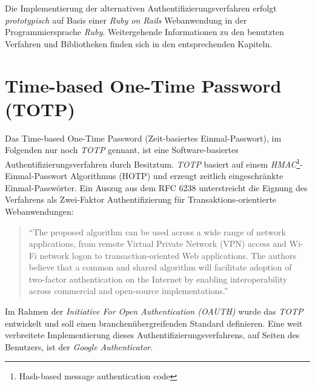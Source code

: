 \documentclass[11pt,a4paper,ngerman]{scrreprt}
\begin{document}
Die Implementierung der alternativen Authentifizierungsverfahren erfolgt \emph{prototypisch} auf Basis einer \textit{Ruby on Rails} Webanwendung in der Programmiersprache \textit{Ruby}. Weitergehende Informationen zu den benutzten Verfahren und Bibliotheken finden sich in den entsprechenden Kapiteln.

\section{Time-based One-Time Password (TOTP)}\label{sec:TOTP}
Das Time-based One-Time Password (Zeit-basiertes Einmal-Passwort), im Folgenden nur noch \textit{TOTP} gennant, ist eine Software-basiertes Authentifizierungsverfahren durch Besitztum. \textit{TOTP} basiert auf einem \textit{HMAC}\footnote{Hash-based message authentication code}-Einmal-Passwort Algorithmus (HOTP) und erzeugt zeitlich eingeschränkte Einmal-Passwörter. Ein Auszug aus dem RFC 6238 unterstreicht die Eignung des Verfahrens als Zwei-Faktor Authentifizierung für Transaktions-orientierte Webanwendungen:
\begin{quote}
    ``The proposed algorithm can be used across a wide range of network
    applications, from remote Virtual Private Network (VPN) access and
    Wi-Fi network logon to transaction-oriented Web applications.  The
    authors believe that a common and shared algorithm will facilitate
    adoption of two-factor authentication on the Internet by enabling
    interoperability across commercial and open-source implementations.'' \cite{rfc6238}
\end{quote}
Im Rahmen der \textit{Initiative For Open Authentication (OAUTH)} wurde das \textit{TOTP} entwickelt und soll einen branchenübergreifenden Standard definieren. Eine weit verbreitete Implementierung dieses Authentifizierungsverfahrens, auf Seiten des Benutzers, ist der \textit{Google Authenticator}.
\end{document}
